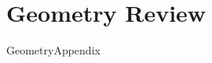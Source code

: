 \documentclass[11pt]{book}
\theoremstyle{definition}  %
\begin{document}
\chapter{Geometry Review}
\label{GeometryAppendix}
\thispagestyle{empty}
{GeometryAppendix}

\backmatter

\let\originalstyle=\thispagestyle            %
\def\thispagestyle#1{\originalstyle{empty}} %
\printindex                                  %
\let\thispagestyle=\originalstyle            %
\end{document}
